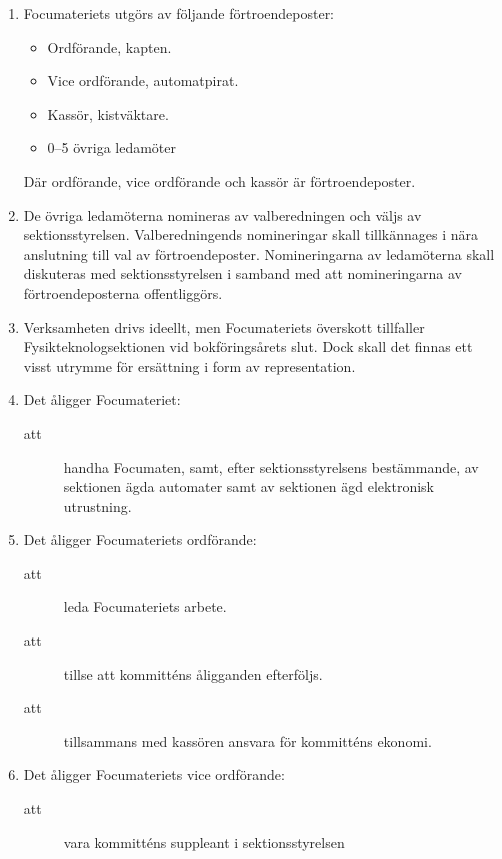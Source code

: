 \documentclass[11pt,a4paper]{article}
\begin{document}
\begin{enumerate}[\thesubsection .1]

  \item Focumateriets utgörs av följande förtroendeposter:
  
    \begin{itemize}
      \item Ordförande, kapten.
      \item Vice ordförande, automatpirat.
      \item Kassör, kistväktare.
      \item 0--5 övriga ledamöter
    \end{itemize}
    Där ordförande, vice ordförande och kassör är förtroendeposter.


\item De övriga ledamöterna nomineras av valberedningen och väljs av sektionsstyrelsen. Valberedningends nomineringar skall tillkännages i nära anslutning till val av förtroendeposter. Nomineringarna av ledamöterna skall diskuteras med sektionsstyrelsen i samband med att nomineringarna av förtroendeposterna offentliggörs. 


  \item Verksamheten drivs ideellt, men Focumateriets överskott
  tillfaller Fys\-ik\-teknolog\-sektionen vid bokföringsårets slut. Dock
  skall det finnas ett visst utrymme för ersättning i form av
  representation.

  \item Det åligger Focumateriet:
    \begin{description}
      \item[att] handha Focumaten, samt, efter sektionsstyrelsens bestämmande,
      av sektionen ägda automater samt av sektionen ägd elektronisk
      utrustning.
   
    \end{description}

  \item Det åligger Focumateriets ordförande:
    \begin{description}
      \item[att] leda Focumateriets arbete.
      \item[att] tillse att kommitténs åligganden efterföljs.
      \item[att] tillsammans med kassören ansvara för kommitténs ekonomi.
    \end{description}

 \item Det åligger Focumateriets vice ordförande:
    \begin{description}
      \item[att] vara kommitténs suppleant i sektionsstyrelsen
      

\end{description}
\end{enumerate}
\end{document}
